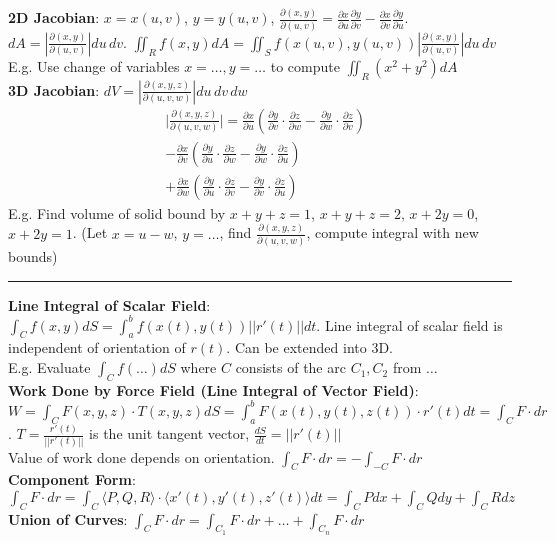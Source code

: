 \documentclass{article}
\begin{document}
{\begin{multicols*}{3}
\textbf{2D Jacobian}: $x=x(u,v)$, $y=y(u,v)$, $\frac{\partial(x,y)}{\partial(u,v)}=\frac{\partial x}{\partial u}\frac{\partial y}{\partial v}-\frac{\partial x}{\partial v}\frac{\partial y}{\partial u}$. $dA=|\frac{\partial(x,y)}{\partial (u,v)}|du\,dv$. $\iint_Rf(x,y)dA=\iint_Sf(x(u,v),y(u,v))|\frac{\partial(x,y)}{\partial (u,v)}|du\,dv$\\
E.g. Use change of variables $x=\dots,y=\dots$ to compute $\iint_R(x^2+y^2)dA$\\
\textbf{3D Jacobian}: $dV=|\frac{\partial(x,y,z)}{\partial(u,v,w)}|du\,dv\,dw$
\begin{align*}
&\Big|\frac{\partial(x,y,z)}{\partial(u,v,w)}\Big|=\frac{\partial x}{\partial u}(\frac{\partial y}{\partial v}\cdot\frac{\partial z}{\partial w}-\frac{\partial y}{\partial w}\cdot\frac{\partial z}{\partial v})\\
&-\frac{\partial x}{\partial v}(\frac{\partial y}{\partial u}\cdot\frac{\partial z}{\partial w}-\frac{\partial y}{\partial w}\cdot\frac{\partial z}{\partial u})\\
&+\frac{\partial x}{\partial w}(\frac{\partial y}{\partial u}\cdot\frac{\partial z}{\partial v}-\frac{\partial y}{\partial v}\cdot\frac{\partial z}{\partial u})
\end{align*}
E.g. Find volume of solid bound by $x+y+z=1$, $x+y+z=2$, $x+2y=0$, $x+2y=1$. (Let $x=u-w$, $y=\dots$, find $\frac{\partial(x,y,z)}{\partial(u,v,w)}$, compute integral with new bounds) \\
\rule{193pt}{0.2pt}
\textbf{Line Integral of Scalar Field}: $\int_Cf(x,y)dS=\int_a^bf(x(t),y(t))||r'(t)||dt$. Line integral of scalar field is independent of orientation of $r(t)$. Can be extended into 3D. \\
E.g. Evaluate $\int_Cf(\dots)dS$ where $C$ consists of the arc $C_1,C_2$ from $\dots$ \\
\textbf{Work Done by Force Field (Line Integral of Vector Field)}: $W=\int_C F(x,y,z)\cdot T(x,y,z)dS =\int_a^bF(x(t),y(t),z(t))\cdot r'(t)dt=\int_CF\cdot dr$. $T=\frac{r'(t)}{||r'(t)||}$ is the unit tangent vector, $\frac{dS}{dt}=||r'(t)||$ \\
Value of work done depends on orientation. $\int_CF\cdot dr=-\int_{-C}F\cdot dr$\\
\textbf{Component Form}: $\int_CF\cdot dr=\int_C\langle P,Q,R\rangle\cdot\langle x'(t),y'(t),z'(t)\rangle dt=\int_CPdx+\int_CQdy+\int_C Rdz$\\
\textbf{Union of Curves}: $\int_CF\cdot dr=\int_{C_1}F\cdot dr+\dots+\int_{C_n}F\cdot dr$\\

\end{multicols*}}
\end{document}
